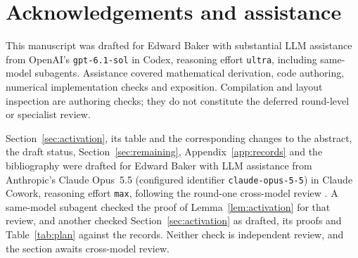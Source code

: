 \documentclass[11pt]{article}
\theoremstyle{remark}
\numberwithin{equation}{section}
\begin{document}
\section*{Acknowledgements and assistance}
This manuscript was drafted for Edward Baker with substantial LLM
assistance from OpenAI's \texttt{gpt-6.1-sol} in Codex, reasoning effort
\texttt{ultra}, including same-model subagents. Assistance covered
mathematical derivation, code authoring, numerical implementation checks
and exposition. Compilation and layout inspection are authoring checks;
they do not constitute the deferred round-level or specialist review.

Section~\ref{sec:activation}, its table and the corresponding changes to
the abstract, the draft status, Section~\ref{sec:remaining},
Appendix~\ref{app:records} and the bibliography were drafted for Edward
Baker with LLM assistance from Anthropic's Claude Opus~5.5 (configured
identifier \texttt{claude-opus-5-5}) in Claude Cowork, reasoning effort
\texttt{max}, following the round-one cross-model review
\cite{claudereview}. A same-model subagent checked the proof of
Lemma~\ref{lem:activation} for that review, and another checked
Section~\ref{sec:activation} as drafted, its proofs and
Table~\ref{tab:plan} against the records. Neither check is independent
review, and the section awaits cross-model review.
\end{document}
